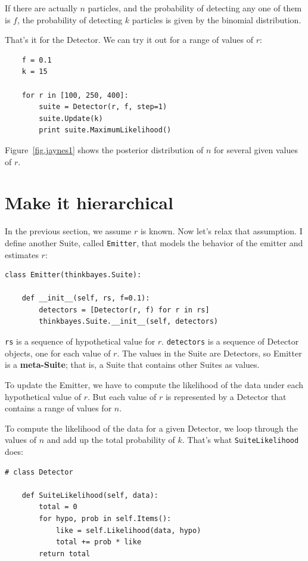 \documentclass[12pt]{book}
\begin{document}
If there are actually $n$ particles, and the probability of detecting
any one of them is $f$, the probability of detecting $k$ particles is
given by the binomial distribution.

That's it for the Detector.  We can try it out for a range
of values of $r$:

\begin{verbatim}
    f = 0.1
    k = 15

    for r in [100, 250, 400]:
        suite = Detector(r, f, step=1)
        suite.Update(k)
        print suite.MaximumLikelihood()
\end{verbatim}

Figure~\ref{fig.jaynes1} shows the posterior distribution of $n$ for
several given values of $r$.


\section{Make it hierarchical}

In the previous section, we assume $r$ is known.  Now let's
relax that assumption.  I define another Suite, called {\tt Emitter},
that models the behavior of the emitter and estimates $r$:

\begin{verbatim}
class Emitter(thinkbayes.Suite):

    def __init__(self, rs, f=0.1):
        detectors = [Detector(r, f) for r in rs]
        thinkbayes.Suite.__init__(self, detectors)
\end{verbatim}

{\tt rs} is a sequence of hypothetical value for $r$.  {\tt detectors}
is a sequence of Detector objects, one for each value of $r$.  The
values in the Suite are Detectors, so Emitter is a {\bf meta-Suite};
that is, a Suite that contains other Suites as values.

To update the Emitter, we have to compute the likelihood of the data
under each hypothetical value of $r$.  But each value of $r$ is
represented by a Detector that contains a range of values for $n$.

To compute the likelihood of the data for a given Detector, we loop
through the values of $n$ and add up the total probability of $k$.
That's what {\tt SuiteLikelihood} does:

\begin{verbatim}
# class Detector

    def SuiteLikelihood(self, data):
        total = 0
        for hypo, prob in self.Items():
            like = self.Likelihood(data, hypo)
            total += prob * like
        return total
\end{verbatim}
\end{document}
